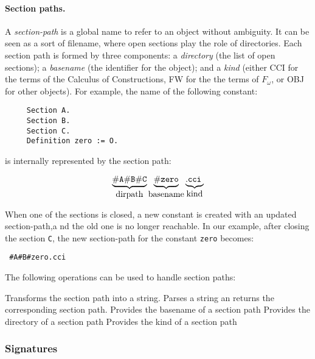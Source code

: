 \paragraph[Section paths.]{Section paths.\label{SectionPaths}}
A \textsl{section-path} is a global name to refer to an object without
ambiguity.  It can be seen as a sort of filename, where open sections
play the role of directories. Each section path is formed by three
components: a \textsl{directory} (the list of open sections); a
\textsl{basename} (the identifier for the object); and a \textsl{kind}
(either CCI for the terms of the Calculus of Constructions, FW for the
the terms of $F_\omega$, or OBJ for other objects). For example, the
name of the following constant:
\begin{verbatim}
     Section A.
     Section B.
     Section C.
     Definition zero := O.
\end{verbatim}

is internally represented by the section path:

$$\underbrace{\mathtt{\#A\#B\#C}}_{\mbox{dirpath}}
\underbrace{\mathtt{\tt \#zero}}_{\mbox{basename}}
\underbrace{\mathtt{\tt .cci}_{\;}}_{\mbox{kind}}$$

When one of the sections is closed, a new constant is created with an
updated section-path,a nd the old one is no longer reachable.  In our
example, after closing the section \texttt{C}, the new section-path
for the constant {\tt zero} becomes:
\begin{center}
\texttt{ \#A\#B\#zero.cci}
\end{center}

The following operations can be used to handle section paths:

\begin{description}
    {Transforms the section path into a string.}
    {Parses a string an returns the corresponding section path.}
    {Provides the basename of a section path}
    {Provides the directory of a section path}
    {Provides the kind of a section path}
\end{description}

\subsubsection{Signatures} 


